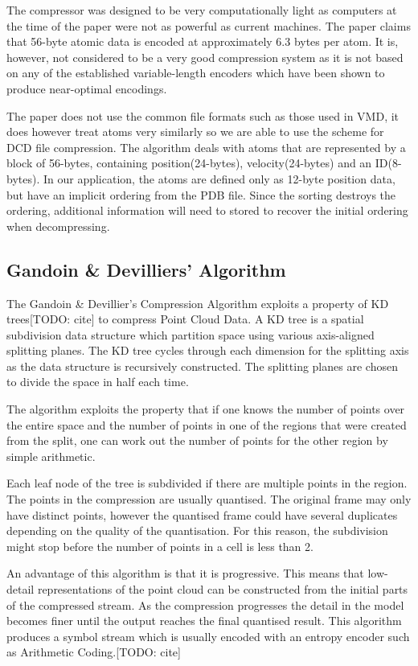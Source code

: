 \documentclass[a4paper,11pt]{report}
\begin{document}
The compressor was designed to be very computationally light as computers at the time of the paper were not as powerful as current machines. The paper claims that 56-byte atomic data is encoded at approximately 6.3 bytes per atom. It is, however, not considered to be a very good compression system as it is not based on any of the established variable-length encoders which have been shown to produce near-optimal encodings.

The paper does not use the common file formats such as those used in VMD, it does however treat atoms very similarly so we are able to use the scheme for DCD file compression. The algorithm deals with atoms that are represented by a block of 56-bytes, containing position(24-bytes), velocity(24-bytes) and an ID(8-bytes). In our application, the atoms are defined only as 12-byte position data, but have an implicit ordering from the PDB file. Since the sorting destroys the ordering, additional information will need to stored to recover the initial ordering when decompressing.

\subsection{Gandoin \& Devilliers' Algorithm}

The Gandoin \& Devillier's Compression Algorithm exploits a property of KD trees[TODO: cite] to compress Point Cloud Data.\cite{devillers2000gci} A KD tree is a spatial subdivision data structure which partition space using various axis-aligned splitting planes. The KD tree cycles through each dimension for the splitting axis as the data structure is recursively constructed. The splitting planes are chosen to divide the space in half each time.

The algorithm exploits the property that if one knows the number of points over the entire space and the number of points in one of the regions that were created from the split, one can work out the number of points for the other region by simple arithmetic.

Each leaf node of the tree is subdivided if there are multiple points in the region. The points in the compression are usually quantised. The original frame may only have distinct points, however the quantised frame could have several duplicates depending on the quality of the quantisation. For this reason, the subdivision might stop before the number of points in a cell is less than 2.

An advantage of this algorithm is that it is progressive. This means that low-detail representations of the point cloud can be constructed from the initial parts of the compressed stream. As the compression progresses the detail in the model becomes finer until the output reaches the final quantised result. This algorithm produces a symbol stream which is usually encoded with an entropy encoder such as Arithmetic Coding.[TODO: cite]
\end{document}
